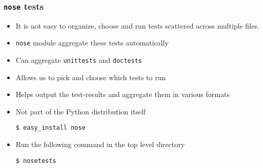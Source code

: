 \documentclass[12pt,presentation]{beamer}
\begin{document}
\begin{frame}[fragile]
  \frametitle{\texttt{nose} tests}
  \begin{itemize}
  \item It is not easy to organize, choose and run tests scattered
    across multiple files. 
  \item \texttt{nose} module aggregate these tests automatically
  \item Can aggregate \texttt{unittests} and \texttt{doctests}
  \item Allows us to pick and choose which tests to run
  \item Helps output the test-results and aggregate them in various
    formats
  \item Not part of the Python distribution itself
\begin{lstlisting}
$ easy_install nose
\end{lstlisting} %
  \item Run the following command in the top level directory
\begin{lstlisting}
$ nosetests
\end{lstlisting} %
  \end{itemize}
\end{frame}
\end{document}
